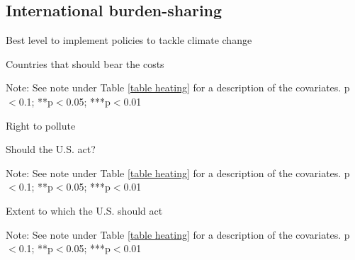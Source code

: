 \documentclass{article}
\begin{document}
\clearpage
\subsection{International burden-sharing}

\begin{table}[h!]
	\caption{Best level to implement policies to tackle climate change}
	\begin{center}
		\scalebox{0.7}{}
	\end{center}
\end{table}	

\begin{landscape}
	\begin{table}[h!]
	\caption{Countries that should bear the costs}
	\begin{center}
		\scalebox{0.6}{}
	\end{center}
	{\footnotesize Note: See note under Table \ref{table heating} for a description of the covariates.
	\newline *p$<$0.1; **p$<$0.05; ***p$<$0.01}
\end{table}	
\end{landscape}


\begin{landscape}
	\begin{table}[h!]
	\caption{Right to pollute}
	\begin{center}
		\scalebox{0.6}{}
	\end{center}
\end{table}	
\end{landscape}

\begin{table}[h!]
	\caption{Should the U.S. act?}
	\begin{center}
		\scalebox{0.7}{}
	\end{center}
	{\footnotesize Note: See note under Table \ref{table heating} for a description of the covariates.
	\newline *p$<$0.1; **p$<$0.05; ***p$<$0.01}
\end{table}	

\begin{table}[h!]
	\caption{Extent to which the U.S. should act}
	\begin{center}
		\scalebox{0.7}{}
	\end{center}
	{\footnotesize Note: See note under Table \ref{table heating} for a description of the covariates.
	\newline *p$<$0.1; **p$<$0.05; ***p$<$0.01}
\end{table}	
\end{document}
